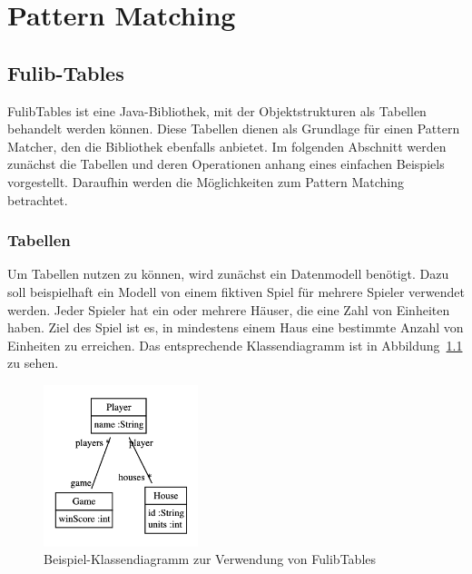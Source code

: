 \chapter{Pattern Matching}\label{ch:pattern-matching}


\section{Fulib-Tables}\label{sec:fulib-tables}

FulibTables\cite{fulibTables} ist eine Java-Bibliothek, mit der Objektstrukturen als Tabellen behandelt werden können.
Diese Tabellen dienen als Grundlage für einen Pattern Matcher, den die Bibliothek ebenfalls anbietet.
Im folgenden Abschnitt werden zunächst die Tabellen und deren Operationen anhang eines einfachen Beispiels vorgestellt.
Daraufhin werden die Möglichkeiten zum Pattern Matching betrachtet.

\subsection{Tabellen}\label{subsec:tables}

Um Tabellen nutzen zu können, wird zunächst ein Datenmodell benötigt.
Dazu soll beispielhaft ein Modell von einem fiktiven Spiel für mehrere Spieler verwendet werden.
Jeder Spieler hat ein oder mehrere Häuser, die eine Zahl von Einheiten haben.
Ziel des Spiel ist es, in mindestens einem Haus eine bestimmte Anzahl von Einheiten zu erreichen.
Das entsprechende Klassendiagramm ist in Abbildung~\ref{fig:game-class-diagram} zu sehen.

\begin{figure}
    \centering
    \includegraphics[width=0.4\textwidth]{chapter/pattern-matching/img/game-class-diagram.png}
    \caption{Beispiel-Klassendiagramm zur Verwendung von FulibTables}
    \label{fig:game-class-diagram}
\end{figure}

